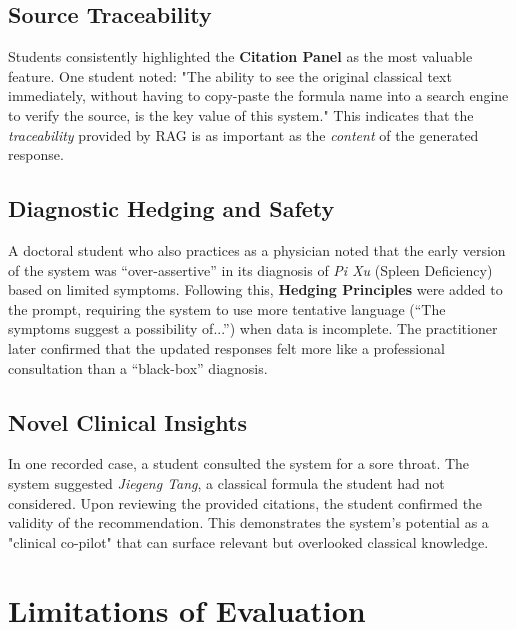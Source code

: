 \begin{itemize}
\subsection{Source Traceability}
Students consistently highlighted the \textbf{Citation Panel} as the most valuable feature. One student noted: "The ability to see the original classical text immediately, without having to copy-paste the formula name into a search engine to verify the source, is the key value of this system." This indicates that the \textit{traceability} provided by RAG is as important as the \textit{content} of the generated response.

\subsection{Diagnostic Hedging and Safety}
A doctoral student who also practices as a physician noted that the early version of the system was ``over-assertive'' in its diagnosis of \textit{Pi Xu} (Spleen Deficiency) based on limited symptoms. Following this, \textbf{Hedging Principles} were added to the prompt, requiring the system to use more tentative language (``The symptoms suggest a possibility of...'') when data is incomplete. The practitioner later confirmed that the updated responses felt more like a professional consultation than a ``black-box'' diagnosis.

\subsection{Novel Clinical Insights}
In one recorded case, a student consulted the system for a sore throat. The system suggested \textit{Jiegeng Tang}, a classical formula the student had not considered. Upon reviewing the provided citations, the student confirmed the validity of the recommendation. This demonstrates the system's potential as a "clinical co-pilot" that can surface relevant but overlooked classical knowledge.

\section{Limitations of Evaluation}


\end{itemize}
